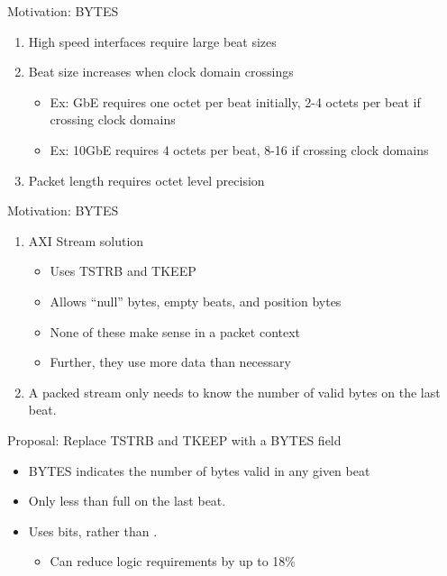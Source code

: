 \documentclass[style=gt,mode=present,paper=screen]{powerdot}
\begin{document}
%
%

\begin{slide}[method=file]{Motivation: BYTES}
\begin{enumerate}
\item High speed interfaces require large beat sizes
\item Beat size increases when clock domain crossings
	\begin{itemize}
	\item Ex: GbE requires one octet per beat initially,
		2-4 octets per beat if crossing clock domains
	\item Ex: 10GbE requires 4 octets per beat,
			8-16 if crossing clock domains
	\end{itemize}
\item Packet length requires octet level precision
\end{enumerate}
\end{slide}

%
\begin{slide}[toc=,method=file]{Motivation: BYTES}
\begin{enumerate}
\item AXI Stream solution
	\begin{itemize}
	\item Uses TSTRB and TKEEP
	\item Allows ``null'' bytes, empty beats, and position bytes
	\item None of these make sense in a packet context
	\item Further, they use more data than necessary
	\end{itemize}
\item A packed stream only needs to know the number of valid bytes on the
	last beat.
\end{enumerate}

Proposal: Replace TSTRB and TKEEP with a BYTES field
\begin{itemize}
\item BYTES indicates the number of bytes valid in any given beat
\item Only less than full on the last beat.
\item Uses  bits, rather than .
\begin{itemize}
	\item Can reduce logic requirements by up to 18\%
\end{itemize}
\end{itemize}
\end{slide}
\end{document}
